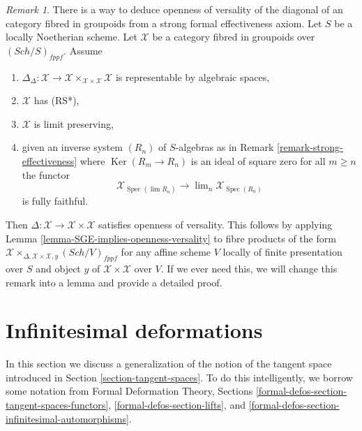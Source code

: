 \documentclass{stacks-project}
\theoremstyle{plain}
\theoremstyle{definition}
\theoremstyle{remark}
\newtheorem{remark}[subsection]{Remark}
\numberwithin{equation}{subsection}
\def\lim{\mathop{\mathrm{lim}}\nolimits}
\def\Spec{\mathop{\mathrm{Spec}}}
\def\Sch{\mathit{Sch}}
\def\Ker{\mathop{\mathrm{Ker}}}
\begin{document}
\begin{remark}
\label{remark-trade-openness-versality-diagonal-with-strong-effectiveness}
There is a way to deduce openness of versality of the diagonal
of an category fibred in groupoids from a strong formal effectiveness
axiom.
Let $S$ be a locally Noetherian scheme. Let $\mathcal{X}$ be a category fibred
in groupoids over $(\Sch/S)_{fppf}$. Assume
\begin{enumerate}
\item $\Delta_\Delta : \mathcal{X} \to
\mathcal{X} \times_{\mathcal{X} \times \mathcal{X}} \mathcal{X}$
is representable by algebraic spaces,
\item $\mathcal{X}$ has (RS*),
\item $\mathcal{X}$ is limit preserving,
\item given an inverse system $(R_n)$ of $S$-algebras
as in Remark \ref{remark-strong-effectiveness}
where $\Ker(R_m \to R_n)$ is an ideal of square zero for all $m \geq n$
the functor
$$
\mathcal{X}_{\Spec(\lim R_n)} \longrightarrow
\lim_n \mathcal{X}_{\Spec(R_n)}
$$
is fully faithful.
\end{enumerate}
Then $\Delta : \mathcal{X} \to \mathcal{X} \times \mathcal{X}$
satisfies openness of versality. This follows by applying
Lemma \ref{lemma-SGE-implies-openness-versality}
to fibre products of the form
$\mathcal{X} \times_{\Delta, \mathcal{X} \times \mathcal{X}, y}
(\Sch/V)_{fppf}$ for any affine scheme $V$ locally
of finite presentation over $S$ and object $y$ of
$\mathcal{X} \times \mathcal{X}$ over $V$.
If we ever need this, we will change this remark into
a lemma and provide a detailed proof.
\end{remark}











\section{Infinitesimal deformations}
\label{section-inf}

\noindent
In this section we discuss a generalization of the notion of the
tangent space introduced in Section \ref{section-tangent-spaces}.
To do this intelligently, we borrow some notation from
Formal Deformation Theory, Sections
\ref{formal-defos-section-tangent-spaces-functors},
\ref{formal-defos-section-lifts}, and
\ref{formal-defos-section-infinitesimal-automorphisms}.
\end{document}
